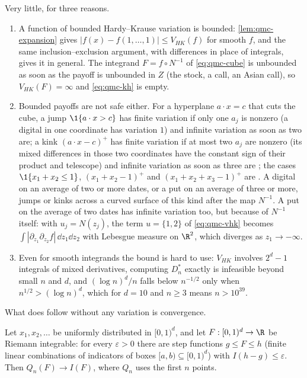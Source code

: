 \begin{remark}\label{rem:qmc-payoffs}
Very little, for three reasons.
\begin{enumerate}[label=(\alph*)]
  \item A function of bounded Hardy--Krause variation is bounded: \cref{lem:qmc-expansion}
    gives $|f(x)-f(1,\dots,1)|\le V_{HK}(f)$ for smooth $f$, and the same inclusion--exclusion
    argument, with differences in place of integrals, gives it in general. The integrand
    $F=f\circ N^{-1}$ of \eqref{eq:qmc-cube} is unbounded as soon as the payoff is unbounded
    in $Z$ (the stock, a call, an Asian call), so $V_{HK}(F)=\infty$ and \eqref{eq:qmc-kh}
    is empty.
  \item Bounded payoffs are not safe either. For a hyperplane $a\cdot x=c$ that cuts the cube,
    a jump $\1\{a\cdot x>c\}$ has finite variation if only one $a_j$ is nonzero (a digital in
    one coordinate has variation $1$) and infinite variation as soon as two are; a kink
    $(a\cdot x-c)^+$ has finite variation if at most two $a_j$ are nonzero (its mixed differences
    in those two coordinates have the constant sign of their product and telescope) and infinite
    variation as soon as three are \citep{owen-2005}; the cases $\1\{x_1+x_2\le1\}$,
    $(x_1+x_2-1)^+$ and $(x_1+x_2+x_3-1)^+$ are . A digital on an average of two
    or more dates, or a put on an average of three or more, jumps or kinks across a curved surface
    of this kind after the map $N^{-1}$. A put on the average of two dates has infinite variation
    too, but because of $N^{-1}$ itself: with $u_j=N(z_j)$, the term $u=\{1,2\}$ of
    \eqref{eq:qmc-vhk} becomes $\int|\partial_{z_1}\partial_{z_2}f|\,\dd z_1\dd z_2$ with Lebesgue
    measure on $\R^2$, which diverges as $z_1\to-\infty$.
  \item Even for smooth integrands the bound is hard to use: $V_{HK}$ involves $2^d-1$
    integrals of mixed derivatives, computing $D^*_n$ exactly is infeasible beyond small $n$
    and $d$, and $(\log n)^d/n$ falls below $n^{-1/2}$ only when $n^{1/2}>(\log n)^d$, which
    for $d=10$ and $n\ge3$ means $n>10^{39}$.
\end{enumerate}
\end{remark}

What does follow without any variation is convergence.

\begin{proposition}\label{prop:qmc-riemann}
Let $x_1,x_2,\dots$ be uniformly distributed in $[0,1)^d$, and let $F:[0,1)^d\to\R$ be Riemann
integrable: for every $\varepsilon>0$ there are step functions $g\le F\le h$ (finite linear
combinations of indicators of boxes $[a,b)\subseteq[0,1)^d$) with $I(h-g)\le\varepsilon$. Then $Q_n(F)\to I(F)$,
where $Q_n$ uses the first $n$ points.
\end{proposition}

